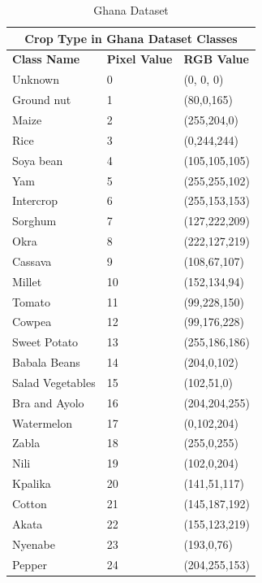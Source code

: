 \documentclass[conference]{IEEEtran}
\begin{document}
\begin{table}[htbp]
\centering
\caption{Ghana Dataset}
\begin{tabular}{|p{2.2cm}|p{0.7cm}|p{1.6cm}|}
 \hline
 \multicolumn{3}{|c|}{\textbf{Crop Type in Ghana Dataset Classes}} \\
 \hline
 \textbf{Class Name} & \textbf{Pixel Value}& \textbf{RGB Value} \\
 \hline
  Unknown & 0  &  (0, 0, 0)\\ 
 \hline
  Ground nut & 1  & (80,0,165) \\ 
 \hline
  Maize & 2  & (255,204,0) \\ 
 \hline
  Rice & 3  & (0,244,244)\\ 
 \hline
  Soya bean & 4  & (105,105,105)\\ 
 \hline
  Yam & 5  & (255,255,102) \\ 
 \hline
  Intercrop & 6  & (255,153,153)\\ 
 \hline
  Sorghum & 7  & (127,222,209)\\ 
 \hline
  Okra & 8  & (222,127,219)\\ 
 \hline
  Cassava & 9  & (108,67,107)\\ 
 \hline
  Millet & 10  & (152,134,94)\\ 
 \hline
  Tomato & 11 & (99,228,150) \\ 
 \hline
  Cowpea & 12  & (99,176,228)\\ 
 \hline
  Sweet Potato & 13 & (255,186,186)\\ 
 \hline
  Babala Beans & 14  & (204,0,102) \\ 
 \hline
  Salad Vegetables & 15  & (102,51,0)\\ 
 \hline
  Bra and Ayolo  & 16  & (204,204,255)\\ 
 \hline
  Watermelon & 17  & (0,102,204)\\ 
 \hline
  Zabla & 18 & (255,0,255)\\ 
 \hline
  Nili & 19 & (102,0,204)\\ 
 \hline
  Kpalika & 20 & (141,51,117)\\ 
 \hline
  Cotton & 21 & (145,187,192)\\ 
 \hline
  Akata & 22 & (155,123,219)\\ 
 \hline
  Nyenabe & 23 & (193,0,76)\\ 
 \hline
  Pepper & 24 & (204,255,153)\\ 
 \hline
\end{tabular}
\label{ghana_dataset_class_table}
\end{table}
\end{document}
